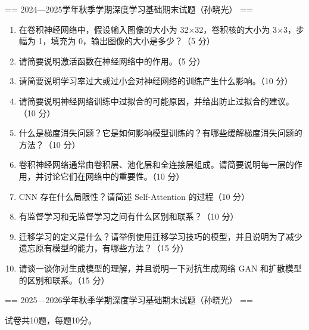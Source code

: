== 2024—2025学年秋季学期深度学习基础期末试题（孙晓光） ==

\begin{enumerate}

\item 在卷积神经网络中，假设输入图像的大小为 32×32，卷积核的大小为 3×3，步幅为 1，填充为 0，输出图像的大小是多少？（5 分）

\item 请简要说明激活函数在神经网络中的作用。（5 分）

\item 请简要说明学习率过大或过小会对神经网络的训练产生什么影响。（10 分）

\item 请简要说明神经网络训练中过拟合的可能原因，并给出防止过拟合的建议。（10 分）

\item 什么是梯度消失问题？它是如何影响模型训练的？有哪些缓解梯度消失问题的方法？（10 分）

\item 卷积神经网络通常由卷积层、池化层和全连接层组成。请简要说明每一层的作用，并讨论它们在网络中的重要性。（10 分）

\item CNN 存在什么局限性？请简述 Self-Attention 的过程（10 分）

\item 有监督学习和无监督学习之间有什么区别和联系？（10 分）

\item 迁移学习的定义是什么？请举例使用迁移学习技巧的模型，并且说明为了减少遗忘原有模型的能力，有哪些方法？（15 分）

\item 请谈一谈你对生成模型的理解，并且说明一下对抗生成网络 GAN 和扩散模型的区别和联系。（15 分）

\end{enumerate}

== 2025—2026学年秋季学期深度学习基础期末试题（孙晓光） ==

试卷共10题，每题10分。

